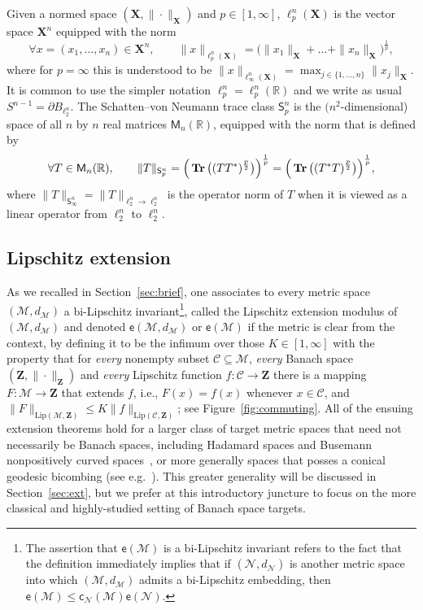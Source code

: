 \documentclass[11pt,reqno]{amsart}
\renewcommand{\le}{\leqslant}
\newcommand{\cc}{\mathsf{c}}
\newcommand{\n}{\{1,\ldots,n\}}
\newcommand{\X}{\mathbf X}
\newcommand{\R}{\mathbb R}
\theoremstyle{remark}
\newcommand{\MM}{\mathcal{M}}
\newcommand{\sfS}{\mathsf{S}}
\renewcommand{\subset}{\subseteq}
\DeclareMathOperator{\trace}{\bf Tr}
\newcommand{\Lip}{\mathrm{Lip}}
\newcommand{\ee}{\mathsf{e}}
\newcommand{\bfZ}{\mathbf{Z}}
\newcommand{\sub}{\mathscr{C}}
\renewcommand{\1}{\mathbf 1}
\begin{document}
Given a normed space $(\X,\|\cdot\|_{\X})$ and $p\in [1,\infty]$,  $\ell_p^n(\X)$ is the vector space $\X^n$ equipped with the norm
$$
\forall x=(x_1,\ldots,x_n)\in \X^n,\qquad \|x\|_{\ell_p^n(\X)}=\big(\|x_1\|_\X+\ldots+\|x_n\|_\X\big)^{\frac{1}{p}},
$$
where for $p=\infty$ this is understood  to be $\|x\|_{\ell_\infty^n(\X)}=\max_{j\in \n}\|x_j\|_\X$. It is common to use the simpler notation $\ell_p^n=\ell_p^n(\R)$ and we write as usual $S^{n-1}=\partial B_{\ell_2^n}$.     The Schatten--von Neumann trace class $\sfS_p^{n}$ is the $(n^2$-dimensional) space of all $n$ by $n$ real matrices $\mathsf{M}_n(\R)$, equipped with the norm that is defined by
$$
\forall T\in \mathsf{M}_n(\R),\qquad \|T\|_{\sfS_p^{n}}=\Big(\trace\big((TT^*)^{\frac{p}{2}}\big)\Big)^{\frac{1}{p}}=\Big(\trace\big((T^*T)^{\frac{p}{2}}\big)\Big)^{\frac{1}{p}},
$$
where $\|T\|_{\sfS_\infty^{n}}=\|T\|_{\ell_2^n\to\ell_2^n}$ is the operator norm of $T$ when it is viewed as a linear operator from $\ell_2^n$ to $\ell_2^n$.



\subsection{Lipschitz extension}\label{sec:ext def} As we recalled  in Section~\ref{sec:brief}, one associates to every metric space $(\MM,d_\MM)$ a bi-Lipschitz invariant\footnote{ The assertion that $\ee(\MM)$ is a bi-Lipschitz invariant refers to the fact that the definition immediately implies that if $(\mathcal{N},d_\mathcal{N})$ is another metric space into which $(\MM,d_\MM)$ admits a bi-Lipschitz embedding, then $\ee(\MM)\le \cc_{\mathcal{N}}(\MM)\ee(\mathcal{N})$.}, called the { Lipschitz extension modulus} of $(\MM,d_\MM)$ and denoted $\ee(\MM,d_\MM)$ or $\ee(\MM)$ if the metric is clear from the context, by defining it to be the infimum over those $K\in [1,\infty]$ with the property that for {\em every} nonempty subset $\sub\subset \MM$, {\em every} Banach space $(\bfZ,\|\cdot\|_{\bfZ})$ and {\em every} Lipschitz function $f:\sub\to \bfZ$ there is a mapping $F:\MM\to \bfZ$ that extends $f$, i.e., $F(x)=f(x)$ whenever $x\in \sub$, and $\|F\|_{\Lip(\MM,\bfZ)}\le K\|f\|_{\Lip(\sub,\bfZ)}$; see Figure~\ref{fig:commuting}. All of the ensuing extension theorems hold for a larger class of target metric spaces that need not necessarily be Banach spaces, including Hadamard spaces and Busemann nonpositively curved spaces~\cite{BH99}, or more generally spaces that posses a conical geodesic bicombing (see e.g.~\cite{Des15}). This greater generality will be discussed in Section~\ref{sec:ext}, but we prefer at this introductory juncture to focus on the more classical and highly-studied setting of Banach space targets.
\end{document}
